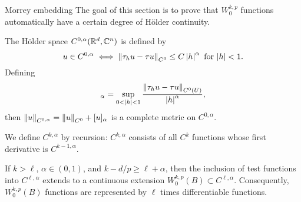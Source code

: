 \documentclass{amsart}
\begin{document}
\begin{clear}{Morrey embedding}
  The goal of this section is to prove that $W^{k,p}_{0}$ functions automatically have a certain degree of H\"older continuity.

  \begin{defn}
    The H\"older space $C^{0,\alpha}(\mathbb{R}^{d},\mathbb{C}^{n})$ is defined by
    \begin{equation*}
      u\in C^{0,\alpha}\iff \left\lVert\tau_{h}u-\tau u\right\rVert_{C^{0}}\le C\left|h\right|^{\alpha}\text{ for $\left|h\right|<1$}.
    \end{equation*}
    Defining
    \begin{equation*}
      [u]_{\alpha}=\sup_{0<\abs{h}<1}\frac{\norm{\tau_{h}u-\tau u}_{C^{0}(U)}}{\abs{h}^{\alpha}},
    \end{equation*}
    then $\left\lVert u\right\rVert_{C^{0,\alpha}}=\left\lVert u\right\rVert_{C^{0}}+[u]_{\alpha}$ is a complete metric on $C^{0,\alpha}$.

    We define $C^{k,\alpha}$ by recursion: $C^{k,\alpha}$ consists of all $C^{k}$ functions whose first derivative is $C^{k-1,\alpha}$.
  \end{defn}
\end{clear}
\begin{thm}
  If $k>\ell$, $\alpha\in (0,1)$, and $k-d/p\ge \ell+\alpha$, then the inclusion of test functions into $C^{\ell,\alpha}$ extends to a continuous extension $W^{k,p}_{0}(B)\subset C^{\ell,\alpha}$. Consequently, $W^{k,p}_{0}(B)$ functions are represented by $\ell$ times differentiable functions.  
\end{thm}
\end{document}
